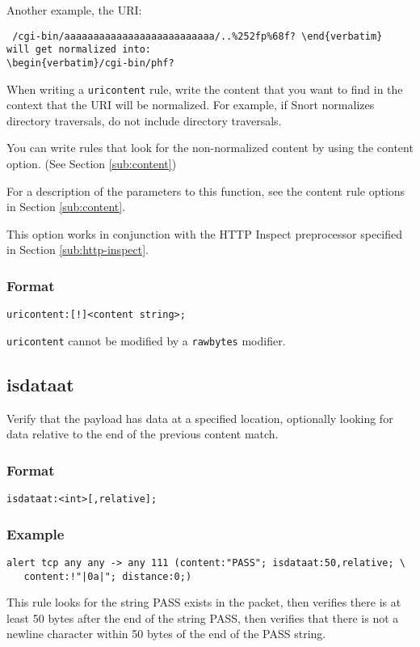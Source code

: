 \documentclass[english]{report}
\newenvironment{note}{
\samepage
    \vspace{10pt}{\textsf{
        {\hspace{7pt}\Huge{$\triangle$\hspace{-12.5pt}{\Large{$^!$}}}}\hspace{5pt}
        {\Large{NOTE}}
    }
    }
   \begin{center}
    \par\vspace{-17pt}

    \begin{lrbox}{\savepar}
    \begin{minipage}[r]{6in}
}
{
    \end{minipage}
    \end{lrbox}
    \fbox{
        \usebox{
            \savepar
	}
    }
    \par\vskip10pt
    \end{center}
}
\begin{document}
Another example, the URI:
\begin{verbatim} /cgi-bin/aaaaaaaaaaaaaaaaaaaaaaaaaa/..%252fp%68f? \end{verbatim}
will get normalized into:
\begin{verbatim}/cgi-bin/phf?\end{verbatim}

When writing a \texttt{uricontent} rule, write the content that you want to
find in the context that the URI will be normalized.  For example, if Snort
normalizes directory traversals, do not include directory traversals.  

You can write rules that look for the non-normalized content by using the
content option.  (See Section \ref{sub:content})

For a description of the parameters to this function, see the content rule
options in Section \ref{sub:content}. 

This option works in conjunction with the HTTP Inspect preprocessor specified
in Section \ref{sub:http-inspect}.

\subsubsection{Format}

\begin{verbatim}
uricontent:[!]<content string>;
\end{verbatim}

\begin{note}
\texttt{uricontent} cannot be modified by a \texttt{rawbytes} modifier.
\end{note}

\subsection{isdataat}

Verify that the payload has data at a specified location, optionally looking for data relative to the end of the previous content match.

\subsubsection{Format}

\begin{verbatim}
isdataat:<int>[,relative];
\end{verbatim}

\subsubsection{Example}
\begin{verbatim}
alert tcp any any -> any 111 (content:"PASS"; isdataat:50,relative; \ 
   content:!"|0a|"; distance:0;)
\end{verbatim}
This rule looks for the string PASS exists in the packet, then verifies there
is at least 50 bytes after the end of the string PASS, then verifies that there
is not a newline character within 50 bytes of the end of the PASS string.
\end{document}
